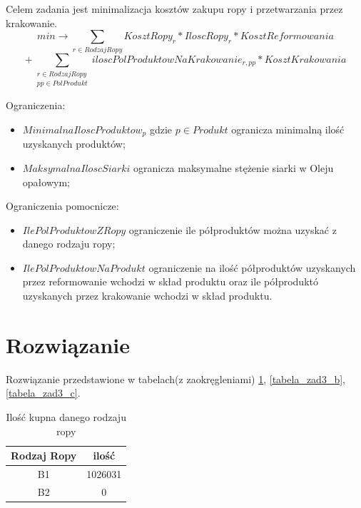Celem zadania jest minimalizacja kosztów zakupu ropy i przetwarzania przez krakowanie.
$$min \rightarrow \sum_{r \in RodzajRopy} KosztRopy_r * IloscRopy_r * KosztReformowania$$
$$+ \sum_{\substack{r \in RodzajRopy\\ pp \in PolProdukt}} iloscPolProduktowNaKrakowanie_{r,pp} * KosztKrakowania$$

Ograniczenia:

\begin{itemize}
    \item $MinimalnaIloscProduktow_{p}$ gdzie $p \in Produkt$ ogranicza minimalną ilość uzyskanych produktów; 
    \item $MaksymalnaIloscSiarki$ ogranicza maksymalne stężenie siarki w Oleju opałowym;
\end{itemize}

Ograniczenia pomocnicze:
\begin{itemize}
    \item $IlePolProduktowZRopy$ ograniczenie ile półproduktów można uzyskać z danego rodzaju ropy; 
    \item $IlePolProduktowNaProdukt$ ograniczenie na ilość półproduktów uzyskanych przez reformowanie wchodzi w skład produktu oraz ile półproduktó uzyskanych przez krakowanie wchodzi w skład produktu.
\end{itemize}

\section{Rozwiązanie}

Rozwiązanie przedstawione w tabelach(z zaokręgleniami) \ref{tabela_zad3_a}, \ref{tabela_zad3_b}, \ref{tabela_zad3_c}.

\begin{table}[ht]
    \begin{center}
        \begin{tabular}{| c | c |} 
            \hline
            \rowcolor{lgray}
            Rodzaj Ropy & ilość \\ [0.5ex] 
            \hline
            B1 & 1026031 \\
            \hline
            B2 & 0 \\
            \hline
        \end{tabular}
        \caption{Ilość kupna danego rodzaju ropy}
        \label{tabela_zad3_a}
    \end{center}
\end{table}

